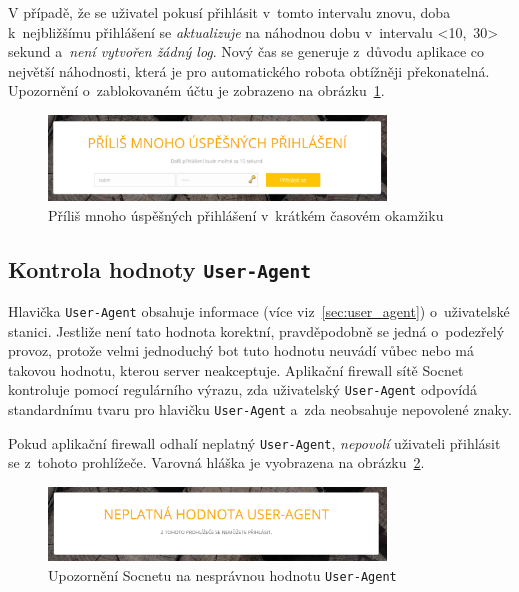 V případě, že se uživatel pokusí přihlásit v~tomto intervalu znovu, doba k~nejbližšímu přihlášení se \textit{aktualizuje} na náhodnou dobu v~intervalu <10,~30> sekund a~\textit{není vytvořen žádný log}. Nový čas se generuje z~důvodu aplikace co největší náhodnosti, která je pro automatického robota obtížněji překonatelná. Upozornění o~zablokovaném účtu je zobrazeno na obrázku~\ref{img:too_many_logins}.

\begin{figure}[H]
	\centering
	\includegraphics[width=0.8\textwidth]{images/too_many_logins.jpg}
	\caption{Příliš mnoho úspěšných přihlášení v~krátkém časovém okamžiku}
	\label{img:too_many_logins}
\end{figure}

\subsection*{Kontrola hodnoty \texttt{User-Agent}}
\label{sec:check_UA}
Hlavička \texttt{User-Agent} obsahuje informace (více viz~\ref{sec:user_agent}) o~uživatelské stanici. Jestliže není tato hodnota korektní, pravděpodobně se jedná o~podezřelý provoz, protože velmi jednoduchý bot tuto hodnotu neuvádí vůbec nebo má takovou hodnotu, kterou server neakceptuje. Aplikační firewall sítě Socnet kontroluje pomocí regulárního výrazu, zda uživatelský \texttt{User-Agent} odpovídá standardnímu tvaru pro hlavičku \texttt{User-Agent} a~zda neobsahuje nepovolené znaky.

Pokud aplikační firewall odhalí neplatný \texttt{User-Agent}, \textit{nepovolí} uživateli přihlásit se z~tohoto prohlížeče. Varovná hláška je vyobrazena na obrázku~\ref{img:bad_user_agent}.

\begin{figure}[H]
	\centering
	\includegraphics[width=0.8\textwidth]{images/bad_user_agent.jpg}
	\caption{Upozornění Socnetu na nesprávnou hodnotu \texttt{User-Agent}}
	\label{img:bad_user_agent}
\end{figure}

